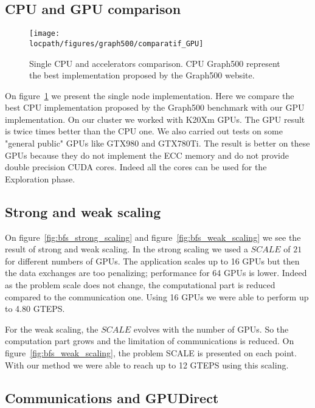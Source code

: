 \subsection{CPU and GPU comparison}

\begin{figure}[!t]
\centering
\texttt{[image: \\locpath/figures/graph500/comparatif\_GPU]}
\caption[]{Single CPU and accelerators comparison. CPU Graph500 represent the best implementation proposed by the Graph500 website. }
\label{fig:single_cpu_accelerators}
\end{figure}

On figure~\ref{fig:single_cpu_accelerators} we present the single node implementation. 
Here we compare the best CPU implementation proposed by the Graph500 benchmark with our GPU implementation. 
On our cluster we worked with K20Xm GPUs. 
The GPU result is twice times better than the CPU one. 
We also carried out tests on some "general public" GPUs like GTX980 and GTX780Ti. 
The result is better on these GPUs because they do not implement the ECC memory and do not provide double precision CUDA cores. 
Indeed all the cores can be used for the Exploration phase. 



\subsection{Strong and weak scaling}

On figure~\ref{fig:bfs_strong_scaling} and figure~\ref{fig:bfs_weak_scaling} we see the result of strong and weak scaling. 
In the strong scaling we used a $SCALE$ of $21$ for different numbers of GPUs. 
The application scales up to 16 GPUs but then the data exchanges are too penalizing;
performance for 64 GPUs is lower. 
Indeed as the problem scale does not change, the computational part is reduced compared to the communication one. 
Using 16 GPUs we were able to perform up to 4.80 GTEPS. 


For the weak scaling, the $SCALE$ evolves with the number of GPUs. 
So the computation part grows and the limitation of communications is reduced. 
On figure~\ref{fig:bfs_weak_scaling}, the problem SCALE is presented on each point. 
With our method we were able to reach up to 12 GTEPS using this scaling. 


\subsection{Communications and GPUDirect}

